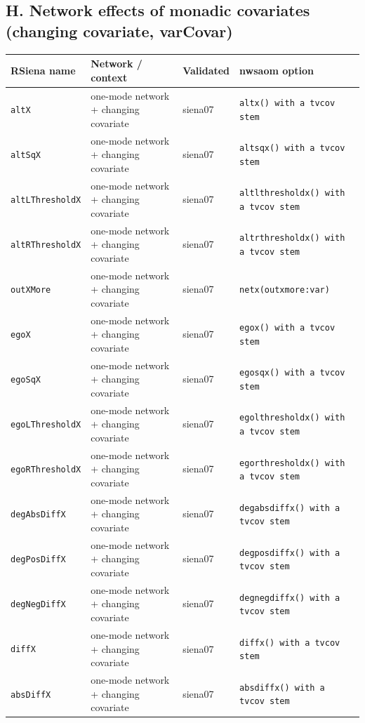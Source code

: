 \subsection*{H. Network effects of monadic covariates (changing covariate, varCovar)}
\footnotesize
\begin{longtable}{@{}p{2.6cm}p{3.2cm}p{2.9cm}p{5.4cm}@{}}
\toprule
RSiena name & Network / context & Validated & nwsaom option\\
\midrule
\endhead
\texttt{altX} & one-mode network + changing covariate & siena07 & \texttt{altx() with a tvcov stem}\\
\texttt{altSqX} & one-mode network + changing covariate & siena07 & \texttt{altsqx() with a tvcov stem}\\
\texttt{altLThresholdX} & one-mode network + changing covariate & siena07 & \texttt{altlthresholdx() with a tvcov stem}\\
\texttt{altRThresholdX} & one-mode network + changing covariate & siena07 & \texttt{altrthresholdx() with a tvcov stem}\\
\texttt{outXMore} & one-mode network + changing covariate & siena07 & \texttt{netx(outxmore:var)}\\
\texttt{egoX} & one-mode network + changing covariate & siena07 & \texttt{egox() with a tvcov stem}\\
\texttt{egoSqX} & one-mode network + changing covariate & siena07 & \texttt{egosqx() with a tvcov stem}\\
\texttt{egoLThresholdX} & one-mode network + changing covariate & siena07 & \texttt{egolthresholdx() with a tvcov stem}\\
\texttt{egoRThresholdX} & one-mode network + changing covariate & siena07 & \texttt{egorthresholdx() with a tvcov stem}\\
\texttt{degAbsDiffX} & one-mode network + changing covariate & siena07 & \texttt{degabsdiffx() with a tvcov stem}\\
\texttt{degPosDiffX} & one-mode network + changing covariate & siena07 & \texttt{degposdiffx() with a tvcov stem}\\
\texttt{degNegDiffX} & one-mode network + changing covariate & siena07 & \texttt{degnegdiffx() with a tvcov stem}\\
\texttt{diffX} & one-mode network + changing covariate & siena07 & \texttt{diffx() with a tvcov stem}\\
\texttt{absDiffX} & one-mode network + changing covariate & siena07 & \texttt{absdiffx() with a tvcov stem}\\

\end{longtable}
